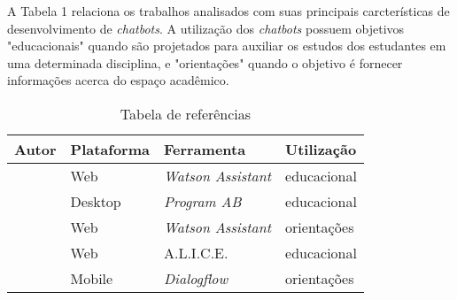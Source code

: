 \documentclass[12pt]{article}
\begin{document}
A Tabela 1 relaciona os trabalhos analisados com suas principais carcterísticas de desenvolvimento de {\itshape chatbots}. A utilização dos {\itshape chatbots} possuem objetivos "educacionais" quando são projetados para auxiliar os estudos dos estudantes em uma determinada disciplina, e "orientações" quando o objetivo é fornecer informações acerca do espaço acadêmico.

\begin{table}[h!]
\caption{Tabela de referências}
\label{table:1}
\begin{tabular}{ |p{3cm}||p{3cm}|p{3cm}|p{3cm}|  }
 \hline
Autor & Plataforma & Ferramenta & Utilização\\
 \hline
 \cite{araujo:20}   & Web    & {\itshape Watson Assistant} &   educacional\\
 \cite{bulhoes:20}&   Desktop  & {\itshape Program AB}   & educacional\\
 \cite{catbot:19} & Web & {\itshape Watson Assistant} &  orientações\\
 \cite{lucchesi:18}    & Web & A.L.I.C.E. & educacional\\
 \cite{maciel:19}  & Mobile  & {\itshape Dialogflow} & orientações\\
 \hline
\end{tabular}
\end{table}










\end{document}
